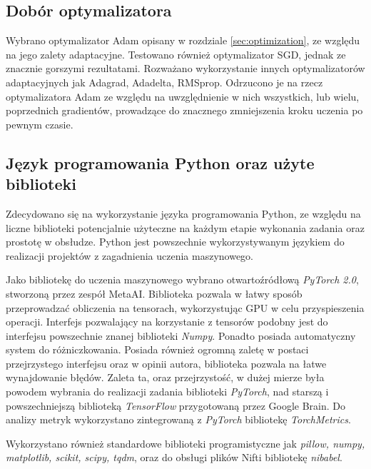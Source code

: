 \subsection{Dobór optymalizatora}
\label{sec:choosing-of-optimizer}
\par
Wybrano optymalizator Adam opisany w rozdziale \ref{sec:optimization}, ze względu na jego zalety adaptacyjne. Testowano również optymalizator SGD, jednak ze znacznie gorszymi rezultatami. Rozważano wykorzystanie innych optymalizatorów adaptacyjnych jak Adagrad, Adadelta, RMSprop. Odrzucono je na rzecz optymalizatora Adam ze względu na uwzględnienie w nich wszystkich, lub wielu, poprzednich gradientów, prowadzące do znacznego zmniejszenia kroku uczenia po pewnym czasie\cite{Haji2021-lj}.


\subsection{Język programowania Python oraz użyte biblioteki}
\label{sec:pyhton}
\par 
Zdecydowano się na wykorzystanie języka programowania Python, ze względu na liczne biblioteki potencjalnie użyteczne na każdym etapie wykonania zadania oraz prostotę w obsłudze. Python jest powszechnie wykorzystywanym językiem do realizacji projektów z zagadnienia uczenia maszynowego. 
\par 
Jako bibliotekę do uczenia maszynowego wybrano otwartoźródłową \textit{PyTorch 2.0}, stworzoną przez zespół MetaAI. Biblioteka pozwala w łatwy sposób przeprowadzać obliczenia na tensorach, wykorzystując GPU w celu przyspieszenia operacji. Interfejs pozwalający na korzystanie z tensorów podobny jest do interfejsu powszechnie znanej biblioteki \textit{Numpy}. Ponadto posiada automatyczny system do różniczkowania. Posiada również ogromną zaletę w postaci przejrzystego interfejsu oraz w opinii autora, biblioteka pozwala na łatwe wynajdowanie błędów. Zaleta ta, oraz przejrzystość, w dużej mierze była powodem wybrania do realizacji zadania biblioteki \textit{PyTorch}, nad starszą i powszechniejszą biblioteką \textit{TensorFlow} przygotowaną przez Google Brain. Do analizy metryk wykorzystano zintegrowaną z \textit{PyTorch} bibliotekę \textit{TorchMetrics}.
\par 
Wykorzystano również standardowe biblioteki programistyczne jak \textit{pillow, numpy, matplotlib, scikit, scipy, tqdm}, oraz do obsługi plików Nifti bibliotekę \textit{nibabel}.